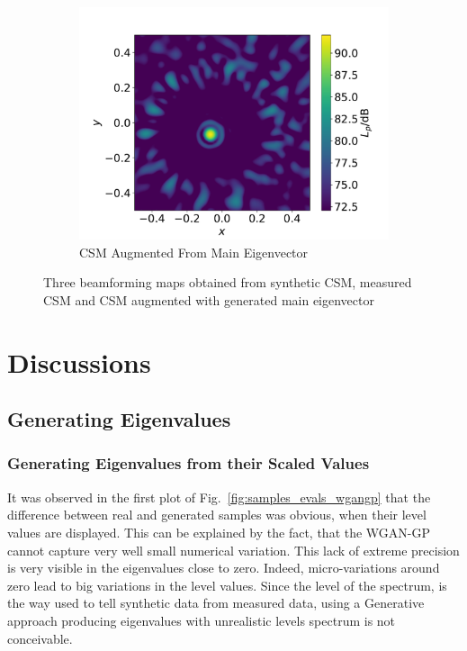 \documentclass[11pt,a4paper,twoside]{report}
\begin{document}
\begin{figure}
    \hfill
    \begin{subfigure}{0.45\textwidth}
        \centering
        \includegraphics[width=1.3\textwidth]{figs/data_augmentation_evecs_augmented_csm.pdf}
        \caption{CSM Augmented From Main Eigenvector} 
        \label{fig:data_augmentation_evecs_augmented_csm}
    \end{subfigure}
            
    \caption{Three beamforming maps obtained from synthetic CSM, measured CSM and CSM augmented with generated main eigenvector}
    \label{fig:data_augmentation_evecs}
\end{figure}

\chapter{Discussions}

\section{Generating Eigenvalues}

\subsection{Generating Eigenvalues from their Scaled Values}

It was observed in the first plot of Fig.~\ref{fig:samples_evals_wgangp} that the difference between real and generated samples was obvious, when their level values are displayed. This can be explained by the fact, that the WGAN-GP cannot capture very well small numerical variation. This lack of extreme precision is very visible in the eigenvalues close to zero. Indeed, micro-variations around zero lead to big variations in the level values. Since the level of the spectrum, is the way used to tell synthetic data from measured data, using a Generative approach producing eigenvalues with unrealistic levels spectrum is not conceivable. 
\end{document}
